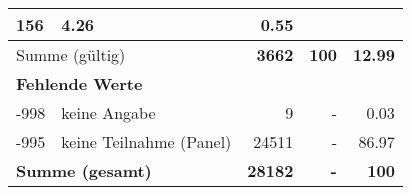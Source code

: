 \begin{longtable}{lXrrr}
       \num{156} &
       \num[round-mode=places,round-precision=2]{4.26} &
         \num[round-mode=places,round-precision=2]{0.55} \\
     \midrule
     \multicolumn{2}{l}{Summe (gültig)} &
       \textbf{\num{3662}} &
     \textbf{\num{100}} &
       \textbf{\num[round-mode=places,round-precision=2]{12.99}} \\
     \multicolumn{5}{l}{\textbf{Fehlende Werte}}\\
       -998 &
       keine Angabe &
         \num{9} &
        - &
         \num[round-mode=places,round-precision=2]{0.03} \\
       -995 &
       keine Teilnahme (Panel) &
         \num{24511} &
        - &
         \num[round-mode=places,round-precision=2]{86.97} \\
     \midrule
     \multicolumn{2}{l}{\textbf{Summe (gesamt)}} &
          \textbf{\num{28182}} &
        \textbf{-} &
        \textbf{\num{100}} \\
     \bottomrule
     \end{longtable}
     
